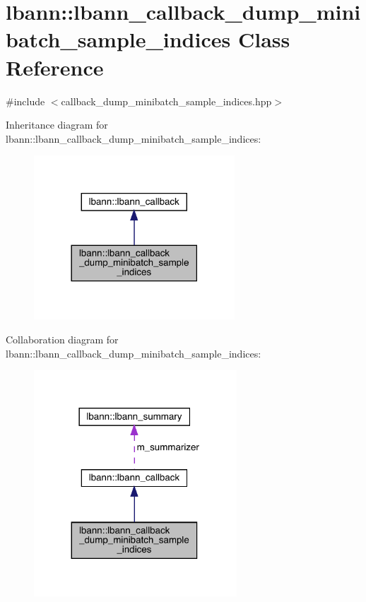 \hypertarget{classlbann_1_1lbann__callback__dump__minibatch__sample__indices}{}\section{lbann\+:\+:lbann\+\_\+callback\+\_\+dump\+\_\+minibatch\+\_\+sample\+\_\+indices Class Reference}
\label{classlbann_1_1lbann__callback__dump__minibatch__sample__indices}


{\ttfamily \#include $<$callback\+\_\+dump\+\_\+minibatch\+\_\+sample\+\_\+indices.\+hpp$>$}



Inheritance diagram for lbann\+:\+:lbann\+\_\+callback\+\_\+dump\+\_\+minibatch\+\_\+sample\+\_\+indices\+:\nopagebreak
\begin{figure}[H]
\begin{center}
\leavevmode
\includegraphics[width=213pt]{classlbann_1_1lbann__callback__dump__minibatch__sample__indices__inherit__graph}
\end{center}
\end{figure}


Collaboration diagram for lbann\+:\+:lbann\+\_\+callback\+\_\+dump\+\_\+minibatch\+\_\+sample\+\_\+indices\+:\nopagebreak
\begin{figure}[H]
\begin{center}
\leavevmode
\includegraphics[width=215pt]{classlbann_1_1lbann__callback__dump__minibatch__sample__indices__coll__graph}
\end{center}
\end{figure}
